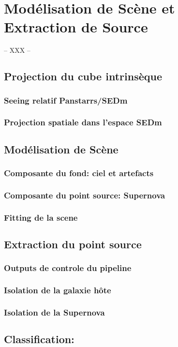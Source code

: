 \documentclass[../main/main.tex]{subfiles}
\begin{document}
\chapter{Modélisation de Scène et Extraction de Source}\label{ch:res}

-- XXX --

\minitoc
\newpage

\section{Projection du cube intrinsèque}

\subsection{Seeing relatif Panstarrs/SEDm}

\subsection{Projection spatiale dans l'espace SEDm}


\section{Modélisation de Scène}

\subsection{Composante du fond: ciel et artefacts}

\subsection{Composante du point source: Supernova}

\subsection{Fitting de la scene}

\section{Extraction du point source}

\subsection{Outputs de controle du pipeline}

\subsection{Isolation de la galaxie hôte}

\subsection{Isolation de la Supernova}

\section{Classification: }
\end{document}
